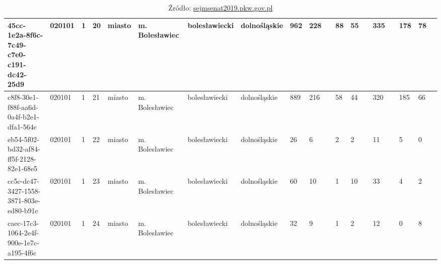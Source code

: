 \begin{table}[]
\begin{adjustbox}{angle=90}
{\begin{tabular}{|l|l|l|l|l|l|l|l|l|l|l|l|l|l|l|l|l|l|l|}
45cc-1e2a-8f6c-7c49-c7e0-c191-dc42-25d9 & 020101 & 1     & 20    & miasto      & m. Bolesławiec & bolesławiecki & dolnośląskie & 962   & 228 &         & 88   & 55  &         & 335 &       & 178 & 78  &        \\ \hline
c8f8-30e1-f88f-aa6d-0a4f-b2e1-dfa1-564c & 020101 & 1     & 21    & miasto      & m. Bolesławiec & bolesławiecki & dolnośląskie & 889   & 216 &         & 58   & 44  &         & 320 &       & 185 & 66  &        \\ \hline
eb54-5f02-bd32-af84-ff5f-2128-82e1-68e5 & 020101 & 1     & 22    & miasto      & m. Bolesławiec & bolesławiecki & dolnośląskie & 26    & 6   &         & 2    & 2   &         & 11  &       & 5   & 0   &        \\ \hline
cc5c-dc47-3427-1558-3871-803e-ed80-b91c & 020101 & 1     & 23    & miasto      & m. Bolesławiec & bolesławiecki & dolnośląskie & 60    & 10  &         & 1    & 10  &         & 33  &       & 4   & 2   &        \\ \hline
caec-17c3-1064-2e4f-900e-1e7c-a195-4f6c & 020101 & 1     & 24    & miasto      & m. Bolesławiec & bolesławiecki & dolnośląskie & 32    & 9   &         & 1    & 2   &         & 12  &       & 0   & 8   &        \\ \hline
\end{tabular}}
\end{adjustbox}
\caption*{Źródło: \url{sejmsenat2019.pkw.gov.pl}}
\end{table}

